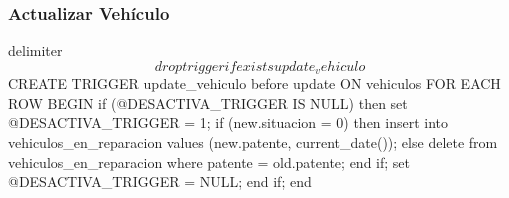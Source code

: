 \subsubsection{Actualizar Veh\'iculo}
\begin{sql}
delimiter $$
drop trigger if exists update_vehiculo $$
CREATE TRIGGER update_vehiculo 
before update ON vehiculos
FOR EACH ROW BEGIN
	if (@DESACTIVA_TRIGGER IS NULL) then
	  set @DESACTIVA_TRIGGER = 1;
	  if (new.situacion = 0) then
		  insert into vehiculos_en_reparacion values (new.patente, current_date()); 
	  else
		  delete from vehiculos_en_reparacion where patente = old.patente; 
	  end if;
	  set @DESACTIVA_TRIGGER = NULL;
	end if;
end $$ 
\end{sql}